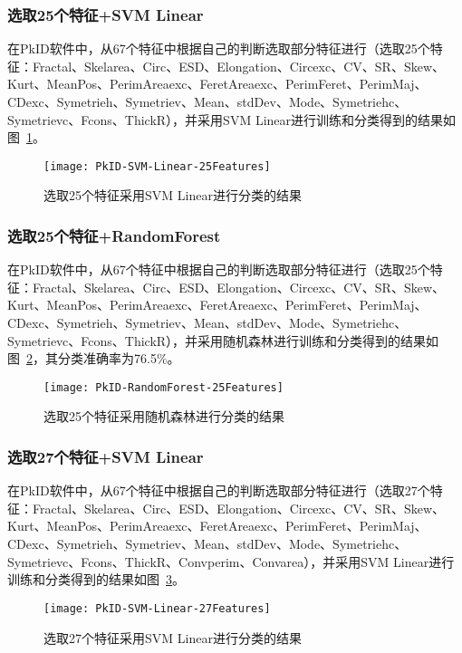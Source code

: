 \subsubsection{选取25个特征+SVM Linear}
在PkID软件中，从67个特征中根据自己的判断选取部分特征进行（选取25个特征：Fractal、Skelarea、Circ、ESD、Elongation、Circexc、CV、SR、Skew、Kurt、MeanPos、PerimAreaexc、FeretAreaexc、PerimFeret、PerimMaj、CDexc、Symetrieh、Symetriev、Mean、stdDev、Mode、Symetriehc、Symetrievc、Fcons、ThickR），并采用SVM Linear进行训练和分类得到的结果如图~\ref{fig:PkID-SVM-Linear-25Features}。

\begin{figure}[!ht]
\centering
\texttt{[image: PkID-SVM-Linear-25Features]}
\caption{选取25个特征采用SVM Linear进行分类的结果}
\label{fig:PkID-SVM-Linear-25Features}
\end{figure}

\subsubsection{选取25个特征+RandomForest}
在PkID软件中，从67个特征中根据自己的判断选取部分特征进行（选取25个特征：Fractal、Skelarea、Circ、ESD、Elongation、Circexc、CV、SR、Skew、Kurt、MeanPos、PerimAreaexc、FeretAreaexc、PerimFeret、PerimMaj、CDexc、Symetrieh、Symetriev、Mean、stdDev、Mode、Symetriehc、Symetrievc、Fcons、ThickR），并采用随机森林进行训练和分类得到的结果如图~\ref{fig:PkID-RandomForest-25Features}，其分类准确率为76.5\%。

\begin{figure}[!ht]
\centering
\texttt{[image: PkID-RandomForest-25Features]}
\caption{选取25个特征采用随机森林进行分类的结果}
\label{fig:PkID-RandomForest-25Features}
\end{figure}

\subsubsection{选取27个特征+SVM Linear}
在PkID软件中，从67个特征中根据自己的判断选取部分特征进行（选取27个特征：Fractal、Skelarea、Circ、ESD、Elongation、Circexc、CV、SR、Skew、Kurt、MeanPos、PerimAreaexc、FeretAreaexc、PerimFeret、PerimMaj、CDexc、Symetrieh、Symetriev、Mean、stdDev、Mode、Symetriehc、Symetrievc、Fcons、ThickR、Convperim、Convarea），并采用SVM Linear进行训练和分类得到的结果如图~\ref{fig:PkID-SVM-Linear-27Features}。

\begin{figure}[!ht]
\centering
\texttt{[image: PkID-SVM-Linear-27Features]}
\caption{选取27个特征采用SVM Linear进行分类的结果}
\label{fig:PkID-SVM-Linear-27Features}
\end{figure}

